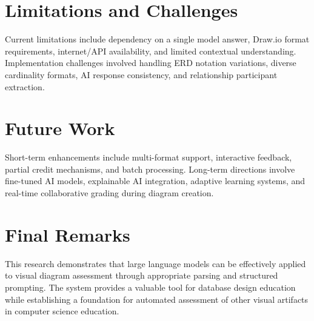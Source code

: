 \section{Limitations and Challenges}

Current limitations include dependency on a single model answer, Draw.io format requirements, internet/API availability, and limited contextual understanding. Implementation challenges involved handling ERD notation variations, diverse cardinality formats, AI response consistency, and relationship participant extraction.

\section{Future Work}

Short-term enhancements include multi-format support, interactive feedback, partial credit mechanisms, and batch processing. Long-term directions involve fine-tuned AI models, explainable AI integration, adaptive learning systems, and real-time collaborative grading during diagram creation.

\section{Final Remarks}

This research demonstrates that large language models can be effectively applied to visual diagram assessment through appropriate parsing and structured prompting. The system provides a valuable tool for database design education while establishing a foundation for automated assessment of other visual artifacts in computer science education.
